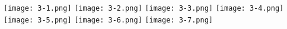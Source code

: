 \documentclass[11pt]{article}
\begin{document}
\begin{center}
  \centering
  \texttt{[image: 3-1.png]} 
  \texttt{[image: 3-2.png]} 
  \texttt{[image: 3-3.png]} 
  \texttt{[image: 3-4.png]} 
  \texttt{[image: 3-5.png]} 
  \texttt{[image: 3-6.png]} 
  \texttt{[image: 3-7.png]} 
\end{center}
\end{document}
